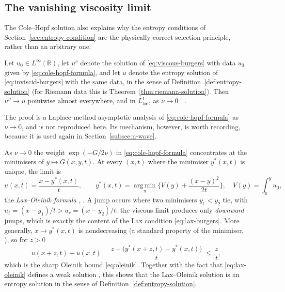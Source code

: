 \subsection{The vanishing viscosity limit}
\label{subsec:vanishing-viscosity}

The Cole--Hopf solution also explains why the entropy conditions of
Section~\ref{sec:entropy-condition} are the physically correct selection
principle, rather than an arbitrary one.

\begin{theorem}
\label{thm:vanishing-viscosity}
Let $u_0\in L^\infty(\mathbb{R})$, let $u^\nu$ denote the solution of
\eqref{eq:viscous-burgers} with data $u_0$ given by
\eqref{eq:cole-hopf-formula}, and let $u$ denote the entropy solution of
\eqref{eq:inviscid-burgers} with the same data, in the sense of
Definition~\ref{def:entropy-solution} (for Riemann data this is
Theorem~\ref{thm:riemann-solution}). Then $u^\nu \to u$ pointwise almost
everywhere, and in $L^1_{\mathrm{loc}}$, as $\nu \to 0^+$ \cite{hopf1950}.
\end{theorem}

The proof is a Laplace-method asymptotic analysis of
\eqref{eq:cole-hopf-formula} as $\nu\to0$, and is not reproduced here. Its
mechanism, however, is worth recording, because it is used again in
Section~\ref{subsec:n-wave}.

\begin{remark}
\label{rem:lax-oleinik}
As $\nu\to0$ the weight $\exp(-G/2\nu)$ in
\eqref{eq:cole-hopf-formula} concentrates at the minimisers of
$y\mapsto G(x,y,t)$. At every $(x,t)$ where the minimiser
$y^*(x,t)$ is unique, the limit is
\begin{equation}
  \label{eq:lax-oleinik}
  u(x,t)=\frac{x-y^*(x,t)}{t},\qquad
  y^*(x,t)=\operatorname*{arg\,min}_y\Big\{V(y)+\frac{(x-y)^2}{2t}\Big\},
  \quad V(y)=\int_0^y u_0 ,
\end{equation}
the \emph{Lax--Oleinik formula} \cite{lax1957,oleinik1957}, \cite[\S3.4.2]{evans2010}. A jump occurs
where two minimisers $y_1<y_2$ tie, with $u_\ell=(x-y_1)/t>u_r=(x-y_2)/t$:
the viscous limit produces only \emph{downward} jumps, which is exactly
the content of the Lax condition \eqref{eq:lax-burgers}. More
generally, $x\mapsto y^*(x,t)$ is nondecreasing (a standard property of the
minimiser, \cite[\S3.4.2]{evans2010}), so for $z>0$
\begin{equation*}
  u(x+z,t)-u(x,t)=\frac{z-\big(y^*(x+z,t)-y^*(x,t)\big)}{t}\ \le\ \frac zt,
\end{equation*}
which is the sharp Oleinik bound \eqref{eq:oleinik}. Together with the fact
that \eqref{eq:lax-oleinik} defines a weak solution
\cite[\S3.4.2]{evans2010}, this shows that the Lax--Oleinik solution is an
entropy solution in the sense of Definition~\ref{def:entropy-solution}.
\end{remark}

